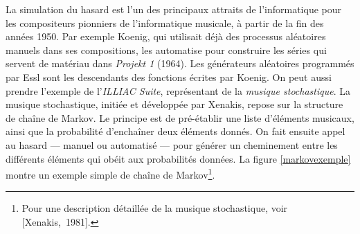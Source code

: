 \documentclass[a4paper,12pt]{article}
\newcommand{\cicite}[1]{{\footnotesize[#1]}}
\begin{document}
La simulation du hasard est l'un des principaux attraits de l'informatique pour les compositeurs pionniers de l'informatique musicale, à partir de la fin des années 1950. Par exemple Koenig, qui utilisait déjà des processus aléatoires manuels dans ses compositions, les automatise pour construire les séries qui servent de matériau dans \emph{Projekt 1} (1964). Les générateurs aléatoires programmés par Essl sont les descendants des fonctions écrites par Koenig. On peut aussi prendre l'exemple de l'\emph{ILLIAC Suite}, représentant de la \emph{musique stochastique}. La musique stochastique, initiée et développée par Xenakis, repose sur la structure de chaîne de Markov. Le principe est de pré-établir une liste d'éléments musicaux, ainsi que la probabilité d'enchaîner deux éléments donnés. On fait ensuite appel au hasard --- manuel ou automatisé --- pour générer un cheminement entre les différents éléments qui obéit aux probabilités données. La figure \ref{markovexemple} montre un exemple simple de chaîne de Markov\footnote{Pour une description détaillée de la musique stochastique, voir \cicite{Xenakis,~1981}.}.
\end{document}
